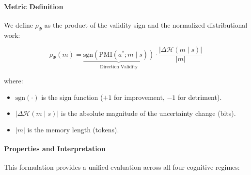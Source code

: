 \paragraph{Metric Definition}

We define $\rho_{\Phi}$ as the product of the validity sign and the normalized distributional work:

\[
\rho_{\Phi}(m) = \underbrace{\text{sgn}(\mathrm{PMI}(a^*; m \mid s))}_{\text{Direction Validity}} \cdot \frac{|\Delta \mathcal{H}(m \mid s)|}{|m|}
\]

where:
\begin{itemize}
    \item $\text{sgn}(\cdot)$ is the sign function ($+1$ for improvement, $-1$ for detriment).
    \item $|\Delta \mathcal{H}(m \mid s)|$ is the absolute magnitude of the uncertainty change (bits).
    \item $|m|$ is the memory length (tokens).
\end{itemize}

\paragraph{Properties and Interpretation}

This formulation provides a unified evaluation across all four cognitive regimes:

